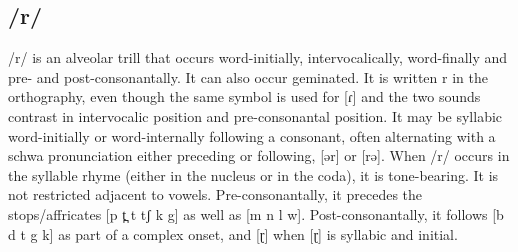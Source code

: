 \subsection{/r/}
/r/ is an alveolar trill that occurs word-initially, intervocalically, word-finally and pre- and post-consonantally. It can also occur geminated. It is written r in the orthography, even though the same symbol is used for [ɾ] and the two sounds contrast in intervocalic position and pre-consonantal position. It may be syllabic word-initially or word-internally following a consonant, often alternating with a schwa pronunciation either preceding or following, [ər] or [rə]. When /r/ occurs in the syllable rhyme (either in the nucleus or in the coda), it is tone-bearing. It is not restricted adjacent to vowels. Pre-consonantally, it precedes the stops/affricates [p t̪ t tʃ k g] as well as [m n l w]. Post-consonantally, it follows [b d t g k] as part of a complex onset, and [ɽ] when [ɽ] is syllabic and initial. 

